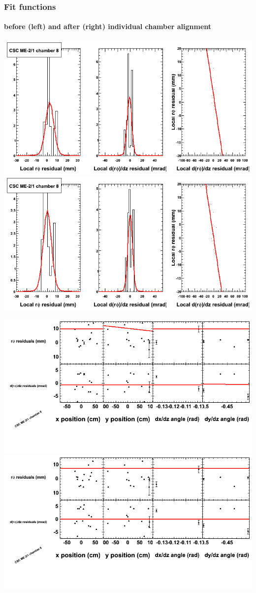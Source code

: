 \documentclass[compress]{beamer}
\begin{document}
\begin{frame}
\frametitle{Fit functions}
\framesubtitle{before (left) and after (right) individual chamber alignment}
\includegraphics[width=0.5\linewidth]{ringfits_3dof/beforefit_MEm21_08_bellcurve.png} \includegraphics[width=0.5\linewidth]{ringfits_3dof/afterfit_MEm21_08_bellcurve.png}

\includegraphics[width=0.5\linewidth]{ringfits_3dof/beforefit_MEm21_08_polynomials.png} \includegraphics[width=0.5\linewidth]{ringfits_3dof/afterfit_MEm21_08_polynomials.png}
\end{frame}
\end{document}
